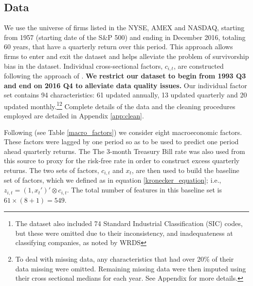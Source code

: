 \documentclass{article}
\begin{document}
\subsection{Data}
We use the universe of firms listed in the NYSE, AMEX and NASDAQ, starting from 1957 (starting date of the S\&P 500) and ending in December 2016, totaling 60 years, that have a quarterly return over this period. This approach allows firms to enter and exit the dataset and helps alleviate the problem of survivorship bias in the dataset. Individual cross-sectional factors, $c_{i,t}$, are constructed following the approach of \cite{gu_empirical_2019}. \textbf{We restrict our dataset to begin from 1993 Q3 and end on 2016 Q4 to alleviate data quality issues.} Our individual factor set contains 94 characteristics: 61 updated annually, 13 updated quarterly and 20 updated monthly.\footnote{The dataset also included 74 Standard Industrial Classification (SIC) codes, but these were omitted due to their inconsistency, and inadequateness at classifying companies, as noted by WRDS}\footnote{To deal with missing data, any characteristics that had over 20\% of their data missing were omitted. Remaining missing data were then imputed using their cross sectional medians for each year. See Appendix for more details.} Complete details of the data and the cleaning procedures employed are detailed in Appendix \ref{app:clean}.


Following \cite{welch_comprehensive_2008} (see Table \ref{macro_factors}) we consider eight macroeconomic factors. These factors were lagged by one period so as to be used to predict one period ahead quarterly returns. The The 3-month Treasury Bill rate was also used from this source to proxy for the risk-free rate in order to construct excess quarterly returns. The two sets of factors, $c_{i, t}$ and $x_t$, are then used to build the baseline set of factors, which we defined as in equation \eqref{kronecker_equation}; i.e., $z_{i, t}= (1, x_t')' \otimes c_{i, t}$. The total number of features in this baseline set is $61 \times (8 + 1) = 549$.
\end{document}
